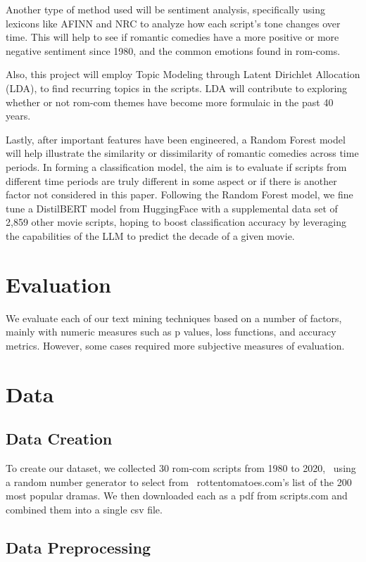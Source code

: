 \documentclass[
  authoryear,
  preprint]{elsarticle}
\begin{document}
Another type of method used will be sentiment analysis, specifically
using lexicons like AFINN and NRC to analyze how each script's tone
changes over time. This will help to see if romantic comedies have a
more positive or more negative sentiment since 1980, and the common
emotions found in rom-coms.

Also, this project will employ Topic Modeling through Latent Dirichlet
Allocation (LDA), to find recurring topics in the scripts. LDA will
contribute to exploring whether or not rom-com themes have become more
formulaic in the past 40 years.

Lastly, after important features have been engineered, a Random Forest
model will help illustrate the similarity or dissimilarity of romantic
comedies across time periods. In forming a classification model, the aim
is to evaluate if scripts from different time periods are truly
different in some aspect or if there is another factor not considered in
this paper. Following the Random Forest model, we fine tune a DistilBERT
model from HuggingFace with a supplemental data set of 2,859 other movie
scripts, hoping to boost classification accuracy by leveraging the
capabilities of the LLM to predict the decade of a given movie.

\section{Evaluation}\label{evaluation}

We evaluate each of our text mining techniques based on a number of
factors, mainly with numeric measures such as p values, loss functions,
and accuracy metrics. However, some cases required more subjective
measures of evaluation.

\section{Data}\label{data}

\subsection{Data Creation}\label{data-creation}

To create our dataset, we collected 30 rom-com scripts from 1980 to
2020,~ using a random number generator to select from~
rottentomatoes.com's list of the 200 most popular dramas. We then
downloaded each as a pdf from scripts.com and combined them into a
single csv file.

\subsection{Data Preprocessing}\label{data-preprocessing}
\end{document}
